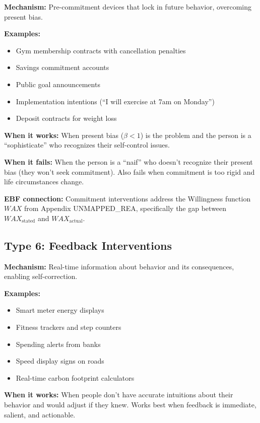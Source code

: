 \textbf{Mechanism:} Pre-commitment devices that lock in future behavior, overcoming present bias.

\textbf{Examples:}
\begin{itemize}[nosep]
\item Gym membership contracts with cancellation penalties
\item Savings commitment accounts \citep{ashraf2006}
\item Public goal announcements
\item Implementation intentions (``I will exercise at 7am on Monday'')
\item Deposit contracts for weight loss
\end{itemize}

\textbf{When it works:} When present bias ($\beta < 1$) is the problem and the person is a ``sophisticate'' who recognizes their self-control issues.

\textbf{When it fails:} When the person is a ``naif'' who doesn't recognize their present bias (they won't seek commitment). Also fails when commitment is too rigid and life circumstances change.

\textbf{EBF connection:} Commitment interventions address the Willingness function $WAX$ from Appendix UNMAPPED_REA, specifically the gap between $WAX_{\text{stated}}$ and $WAX_{\text{actual}}$.

\subsection{Type 6: Feedback Interventions}

\textbf{Mechanism:} Real-time information about behavior and its consequences, enabling self-correction.

\textbf{Examples:}
\begin{itemize}[nosep]
\item Smart meter energy displays
\item Fitness trackers and step counters
\item Spending alerts from banks
\item Speed display signs on roads
\item Real-time carbon footprint calculators
\end{itemize}

\textbf{When it works:} When people don't have accurate intuitions about their behavior and would adjust if they knew. Works best when feedback is immediate, salient, and actionable.


